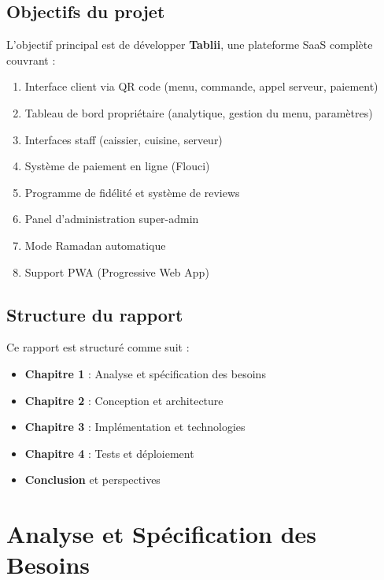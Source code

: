 \documentclass[12pt,a4paper]{report}
\begin{document}
\section*{Objectifs du projet}

L'objectif principal est de développer \textbf{Tablii}, une plateforme SaaS complète couvrant :
\begin{enumerate}
    \item Interface client via QR code (menu, commande, appel serveur, paiement)
    \item Tableau de bord propriétaire (analytique, gestion du menu, paramètres)
    \item Interfaces staff (caissier, cuisine, serveur)
    \item Système de paiement en ligne (Flouci)
    \item Programme de fidélité et système de reviews
    \item Panel d'administration super-admin
    \item Mode Ramadan automatique
    \item Support PWA (Progressive Web App)
\end{enumerate}

\section*{Structure du rapport}

Ce rapport est structuré comme suit :
\begin{itemize}
    \item \textbf{Chapitre 1} : Analyse et spécification des besoins
    \item \textbf{Chapitre 2} : Conception et architecture
    \item \textbf{Chapitre 3} : Implémentation et technologies
    \item \textbf{Chapitre 4} : Tests et déploiement
    \item \textbf{Conclusion} et perspectives
\end{itemize}

\cleardoublepage

\chapter{Analyse et Spécification des Besoins}
\end{document}
